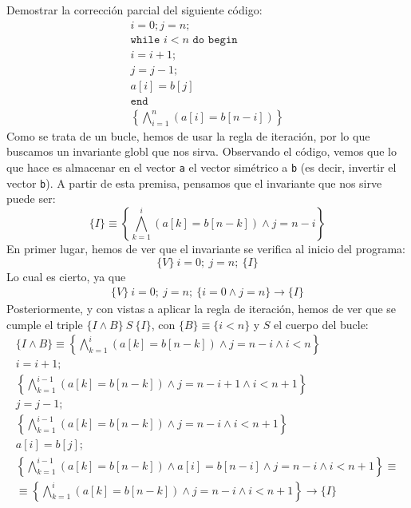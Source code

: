 \begin{ejercicio}
    Demostrar la corrección parcial del siguiente código:
    \begin{gather*}
        i = 0; j= n; \\
        \texttt{while\ } i < n \texttt{\ do\ begin} \\
        i = i + 1; \\
        j = j - 1; \\
        a[i] = b[j] \\
        \texttt{end} \\
        \left\{\bigwedge_{i=1}^n(a[i] = b[n-i])\right\}
    \end{gather*}
    Como se trata de un bucle, hemos de usar la regla de iteración, por lo que buscamos un invariante globl que nos sirva. Observando el código, vemos que lo que hace es almacenar en el vector \verb|a| el vector simétrico a \verb|b| (es decir, invertir el vector \verb|b|). A partir de esta premisa, pensamos que el invariante que nos sirve puede ser:
    \begin{equation*}
        \{I\} \equiv \left\{\bigwedge_{k=1}^{i}(a[k] = b[n-k]) \land j = n-i\right\}
    \end{equation*}
    En primer lugar, hemos de ver que el invariante se verifica al inicio del programa:
    \begin{equation*}
        \{V\}\ i=0;\ j=n;\ \{I\}
    \end{equation*}
    Lo cual es cierto, ya que
    \begin{gather*}
        \{V\}\ i=0;\ j=n;\ \{i = 0 \land j = n\} \rightarrow \{I\}
    \end{gather*}
    Posteriormente, y con vistas a aplicar la regla de iteración, hemos de ver que se cumple el triple $\{I \land B\}\ S\ \{I\}$, con $\{B\} \equiv \{i < n\}$ y $S$ el cuerpo del bucle:
    \begin{gather*}
        \{I \land B\} \equiv \left\{\bigwedge_{k=1}^{i}(a[k] = b[n-k]) \land j = n-i \land i <n\right\} \\
        i = i + 1; \\
        \left\{\bigwedge_{k=1}^{i-1}(a[k] = b[n-k]) \land j = n-i+1 \land i < n+1\right\} \\
        j = j - 1; \\
        \left\{\bigwedge_{k=1}^{i-1}(a[k] = b[n-k]) \land j = n-i \land i < n+1\right\} \\
        a[i] = b[j]; \\
        \left\{\bigwedge_{k=1}^{i-1}(a[k] = b[n-k]) \land a[i] = b[n-i] \land j = n-i \land i < n+1\right\} \equiv \\
        \equiv \left\{\bigwedge_{k=1}^{i}(a[k] = b[n-k]) \land j = n-i \land i < n+1\right\}\rightarrow \{I\}
    \end{gather*}


\end{ejercicio}
